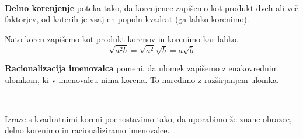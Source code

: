             

                ~~

                \textbf{Delno korenjenje} poteka tako, da korenjenec zapišemo kot produkt dveh ali več faktorjev,
                od katerih je vsaj en popoln kvadrat (ga lahko korenimo).
                
                Nato koren zapišemo kot produkt korenov in korenimo kar lahko.
                $$\sqrt{a^2b}=\sqrt{a^2}\sqrt{b}=a\sqrt{b}$$
            
                

                \textbf{Racionalizacija imenovalca} pomeni, da ulomek zapišemo z enakovrednim ulomkom, ki v imenovalcu nima korena.
                To naredimo z razširjanjem ulomka.
            
                    ~~
            
                Izraze s kvadratnimi koreni poenostavimo tako, da uporabimo že znane obrazce, delno korenimo in racionaliziramo imenovalce.
            
        ~~\\~~


